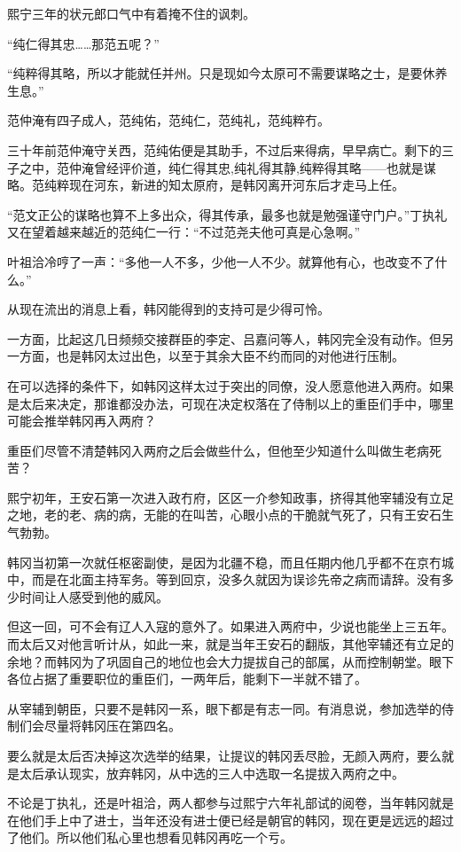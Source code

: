 熙宁三年的状元郎口气中有着掩不住的讽刺。

“纯仁得其忠……那范五呢？”

“纯粹得其略，所以才能就任并州。只是现如今太原可不需要谋略之士，是要休养生息。”

范仲淹有四子成人，范纯佑，范纯仁，范纯礼，范纯粹冇。

三十年前范仲淹守关西，范纯佑便是其助手，不过后来得病，早早病亡。剩下的三子之中，范仲淹曾经评价道，纯仁得其忠,纯礼得其静,纯粹得其略——也就是谋略。范纯粹现在河东，新进的知太原府，是韩冈离开河东后才走马上任。

“范文正公的谋略也算不上多出众，得其传承，最多也就是勉强谨守门户。”丁执礼又在望着越来越近的范纯仁一行：“不过范尧夫他可真是心急啊。”

叶祖洽冷哼了一声：“多他一人不多，少他一人不少。就算他有心，也改变不了什么。”

从现在流出的消息上看，韩冈能得到的支持可是少得可怜。

一方面，比起这几日频频交接群臣的李定、吕嘉问等人，韩冈完全没有动作。但另一方面，也是韩冈太过出色，以至于其余大臣不约而同的对他进行压制。

在可以选择的条件下，如韩冈这样太过于突出的同僚，没人愿意他进入两府。如果是太后来决定，那谁都没办法，可现在决定权落在了侍制以上的重臣们手中，哪里可能会推举韩冈再入两府？

重臣们尽管不清楚韩冈入两府之后会做些什么，但他至少知道什么叫做生老病死苦？

熙宁初年，王安石第一次进入政冇府，区区一介参知政事，挤得其他宰辅没有立足之地，老的老、病的病，无能的在叫苦，心眼小点的干脆就气死了，只有王安石生气勃勃。

韩冈当初第一次就任枢密副使，是因为北疆不稳，而且任期内他几乎都不在京冇城中，而是在北面主持军务。等到回京，没多久就因为误诊先帝之病而请辞。没有多少时间让人感受到他的威风。

但这一回，可不会有辽人入寇的意外了。如果进入两府中，少说也能坐上三五年。而太后又对他言听计从，如此一来，就是当年王安石的翻版，其他宰辅还有立足的余地？而韩冈为了巩固自己的地位也会大力提拔自己的部属，从而控制朝堂。眼下各位占据了重要职位的重臣们，一两年后，能剩下一半就不错了。

从宰辅到朝臣，只要不是韩冈一系，眼下都是有志一同。有消息说，参加选举的侍制们会尽量将韩冈压在第四名。

要么就是太后否决掉这次选举的结果，让提议的韩冈丢尽脸，无颜入两府，要么就是太后承认现实，放弃韩冈，从中选的三人中选取一名提拔入两府之中。

不论是丁执礼，还是叶祖洽，两人都参与过熙宁六年礼部试的阅卷，当年韩冈就是在他们手上中了进士，当年还没有进士便已经是朝官的韩冈，现在更是远远的超过了他们。所以他们私心里也想看见韩冈再吃一个亏。

